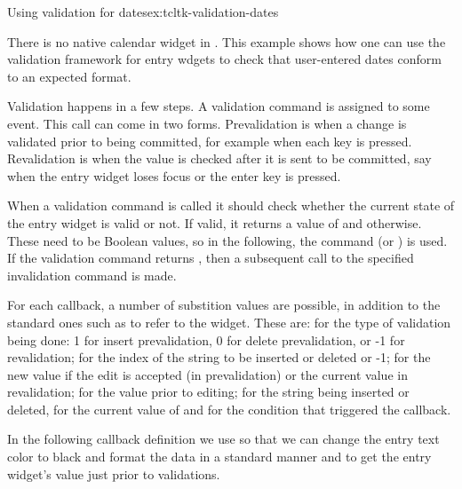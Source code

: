 

\begin{example}{Using validation for dates}{ex:tcltk-validation-dates}



There is no native calendar widget in . This example shows how one can use the validation framework for entry wdgets to check that user-entered dates conform to an expected format. 

Validation happens in a few steps.  A validation command is assigned
to some event. This call can come in two forms. Prevalidation is when
a change is validated prior to being committed, for example when each key
is pressed.  Revalidation is when the value is checked
after it is sent to be committed, say when the entry widget loses
focus or the enter key is pressed.

When a validation command is called it should check
whether the current state of the entry widget is valid or not. If
valid, it returns a value of  and 
otherwise. These need to be \TCL\/ Boolean values, so in the following,
the command  (or ) is used. If
the validation command returns , then a subsequent call to
the specified invalidation command is made.

For each callback, a number of substition values are possible, in
addition to the standard ones such as  to refer to the
widget. These are:  for the type of validation being done: 1
for insert prevalidation, 0 for delete prevalidation, or -1 for
revalidation;  for the index of the string to be inserted or
deleted or -1;  for the new value if the edit is accepted (in
prevalidation) or the current value in revalidation;  for the
value prior to editing;  for the string being inserted or
deleted,  for the current value of  and
 for the condition that triggered the callback.

In the following callback definition we use  so that we can change the entry text color to black and format the data in a standard manner and  to get the entry widget's value just prior to validations.



\end{example}
